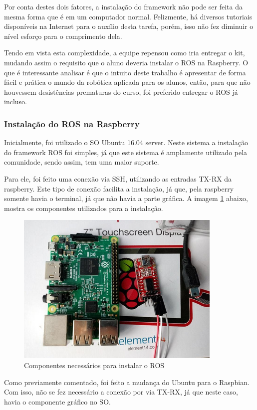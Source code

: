 Por conta destes dois fatores, a instalação do framework não pode ser feita da mesma forma que é em um computador normal. Felizmente, há diversos tutoriais disponíveis na Internet para o auxílio desta tarefa, porém, isso não fez diminuir o nível esforço para o comprimento dela.

Tendo em vista esta complexidade, a equipe repensou como iria entregar o kit, mudando assim o requisito que o aluno deveria instalar o ROS na Raspberry. O que é interessante analisar é que o intuito deste trabalho é apresentar de forma fácil e prática o mundo da robótica aplicada para os alunos, então, para que não houvessem desistências prematuras do curso, foi preferido entregar o ROS já incluso.
\subsubsection{Instalação do ROS na Raspberry}

Inicialmente, foi utilizado o SO Ubuntu 16.04 server. Neste sistema a instalação do framework ROS foi simples, já que este sistema é amplamente utilizado pela comunidade, sendo assim, tem uma maior suporte.

Para ele, foi feito uma conexão via SSH, utilizando as entradas TX-RX da raspberry. Este tipo de conexão facilita a instalação, já que, pela raspberry somente havia o terminal, já que não havia a parte gráfica. A imagem \ref{fig:txrx} abaixo, mostra os componentes utilizados para a instalação.

\begin{figure}[H]
	\centering
	\includegraphics[scale=0.8, angle=0]{Figures/TX-RXconexao.png}
	\caption{Componentes necessários para instalar o ROS}
	\label{fig:txrx}
\end{figure}

Como previamente comentado, foi feito a mudança do Ubuntu para o Raspbian. Com isso, não se fez necessário a conexão por via TX-RX, já que neste caso, havia o componente gráfico no SO.

